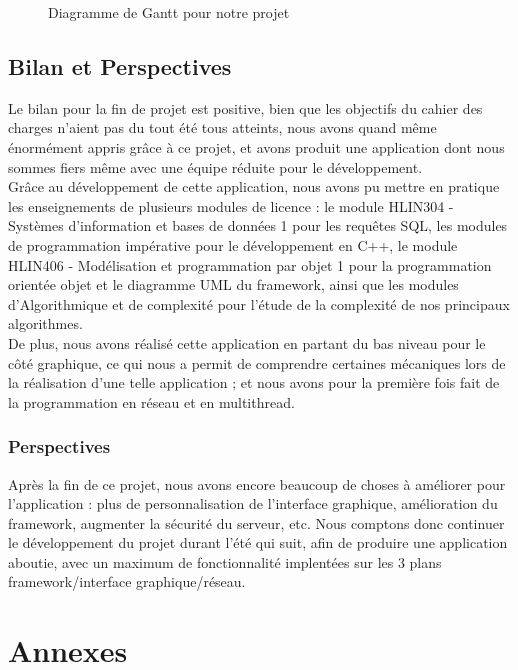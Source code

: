 \documentclass[twoside]{report}
\begin{document}
\begin{figure}[b]
    \centering
    \caption{Diagramme de Gantt pour notre projet}
    \label{Gantt}
\end{figure}
\chapter{Bilan et Perspectives} %
Le bilan pour la fin de projet est positive, bien que les objectifs du cahier des charges n'aient pas du tout été tous atteints, nous avons quand même énormément appris grâce à ce projet, et avons produit une application dont nous sommes fiers même avec une équipe réduite pour le développement. \\
Grâce au développement de cette application, nous avons pu mettre en pratique les enseignements de plusieurs modules de licence : le module HLIN304 - Systèmes d'information et bases de données 1 pour les requêtes SQL, les modules de programmation impérative pour le développement en C++, le module HLIN406 - Modélisation et programmation par objet 1 pour la programmation orientée objet et le diagramme UML du framework, ainsi que les modules d'Algorithmique et de complexité pour l'étude de la complexité de nos principaux algorithmes. \\
De plus, nous avons réalisé cette application en partant du bas niveau pour le côté graphique, ce qui nous a permit de comprendre certaines mécaniques lors de la réalisation d'une telle application ; et nous avons pour la première fois fait de la programmation en réseau et en multithread.

\section*{Perspectives}
Après la fin de ce projet, nous avons encore beaucoup de choses à améliorer pour l'application : plus de personnalisation de l'interface graphique, amélioration du framework, augmenter la sécurité du serveur, etc. Nous comptons donc continuer le développement du projet durant l'été qui suit, afin de produire une application aboutie, avec un maximum de fonctionnalité implentées sur les 3 plans framework/interface graphique/réseau.


\part*{Annexes}
\end{document}
